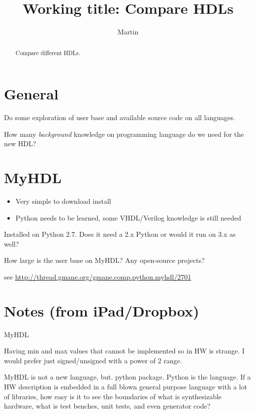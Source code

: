 \documentclass[10pt, conference, compsocconf]{IEEEtran}
\begin{document}
\title{Working title: Compare HDLs}

\author{Martin}


\maketitle \thispagestyle{empty}

\begin{abstract}
Compare different HDLs.
\end{abstract}

\section{General}

Do some exploration of user base and available source code on all languages.

How many \emph{background} knowledge on programming language do we need for the new HDL?

\section{MyHDL}

\begin{itemize}
\item Very simple to download install
\item Python needs to be learned, some VHDL/Verilog knowledge is still needed
\end{itemize}

Installed on Python 2.7. Does it need a 2.x Python or would it run on 3.x as well?

How large is the user base on MyHDL? Any open-source projects?

see \url{http://thread.gmane.org/gmane.comp.python.myhdl/2701}

\section{Notes (from iPad/Dropbox)}

MyHDL

Having min and max values that cannot be implemented so in HW is strange. I would prefer just signed/unsigned with a power of 2 range.

MyHDL is not a new language, but. python package. Python is the language. If a HW description is embedded in a full blown general purpose language with a lot of libraries, how easy is it to see the boundaries of what is synthesizable hardware, what is test benches, unit tests, and even generator code?
\end{document}
